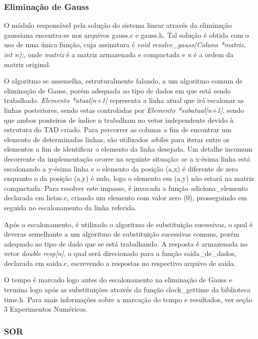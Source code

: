 \documentclass[
	article,			%
	11pt,				%
	oneside,			%
	a4paper,			%
	english,			%
	brazil,				%
	sumario=tradicional
	]{abntex2}
\begin{document}
\subsubsection{Eliminação de Gauss}

O módulo responsável pela solução do sistema linear através da eliminação gaussiana encontra-se nos arquivos gauss.c e gauss.h. Tal solução é obtida com o uso de uma única função, cuja assinatura é \emph{void resolve\_gauss(Coluna *matriz, int n);}, onde \emph{matriz} é a matriz armazenada e compactada e \emph{n} é a ordem da matriz original.

O algoritmo se assemelha, estruturalmente falando, a um algoritmo comum de eliminação de Gauss, porém adequada ao tipo de dados em que está sendo trabalhado. \emph{Elemento *atual[n+1]} representa a linha atual que irá escalonar as linhas posteriores, sendo estas controladas por \emph{Elemento *subatual[n+1]}, sendo que ambos ponteiros de índice n trabalham no vetor independente devido à estrutura do TAD criado. Para percorrer as colunas a fim de encontrar um elemento de determinadas linhas, são utilizados \emph{while}s para iterar entre os elementos a fim de identificar o elemento da linha desejada. Um detalhe incomum decorrente da implementação ocorre na seguinte situação: se a x-ésima linha está escalonando a y-ésima linha e o elemento da posição (a,x) é diferente de zero enquanto o da posição (a,y) é nulo, logo o elemento em (a,y) não estará na matriz compactada. Para resolver este impasse, é invocada a função adiciona\_elemento declarada em listas.c, criando um elemento com valor zero (0), prosseguindo em seguida no escalonamento da linha referida.

Após o escalonamento, é utilizado o algoritmo de substituição sucessivas, o qual é deveras semelhante a um algoritmo de substituição sucessivas comuns, porém adequado ao tipo de dado que se está trabalhando. A resposta é armazenada no vetor \emph{double resp[n]}, o qual será direcionado para a função saída\_de\_dados, declarada em saida.c, escrevendo a respostas no respectivo arquivo de saída.

O tempo é marcado logo antes do escalonamento na eliminação de Gauss e termina logo após as substituições através da função clock\_gettime da biblioteca time.h. Para mais informações sobre a marcação do tempo e resultados, ver seção 3 Experimentos Numéricos.

\subsubsection{SOR}
\end{document}
